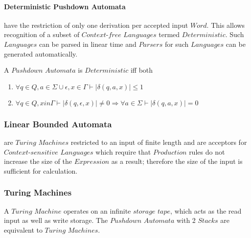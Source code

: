 \documentclass{article}
\begin{document}
\paragraph{Deterministic Pushdown Automata} have the
restriction of only one derivation per accepted input $Word$. This
allows recognition of a subset of $Context$-$free$ $Languages$ termed
$Deterministic$. Such $Languages$ can be parsed in linear time and
$Parsers$ for such $Languages$ can be generated automatically.

A $Pushdown$ $Automata$ is $Deterministic$ iff both
\begin{enumerate}
\item $\forall q \in Q, a \in \Sigma \cup {\epsilon}, x \in
  \Gamma \vdash |\delta(q,a,x)| \leq 1$
\item $\forall q \in Q, x in \Gamma \vdash |\delta(q,\epsilon,x)|
  \neq 0 \Rightarrow \forall a \in \Sigma \vdash |\delta(q,a,x)|=0$
\end{enumerate}

\subsubsection{Linear Bounded Automata} are $Turing$ $Machines$
restricted to an input of finite length and are acceptors for
$Context$-$sensitive$ $Languages$ which require that $Production$
rules do not increase the size of the $Expression$ as a result;
therefore the size of the input is sufficient for calculation.

\subsubsection{Turing Machines}
A $Turing$ $Machine$ operates on an infinite $storage$ $tape$, which
acts as the read input as well as write storage. The $Pushdown$
$Automata$ with 2 $Stacks$ are equivalent to $Turing$ $Machines$.
\end{document}

